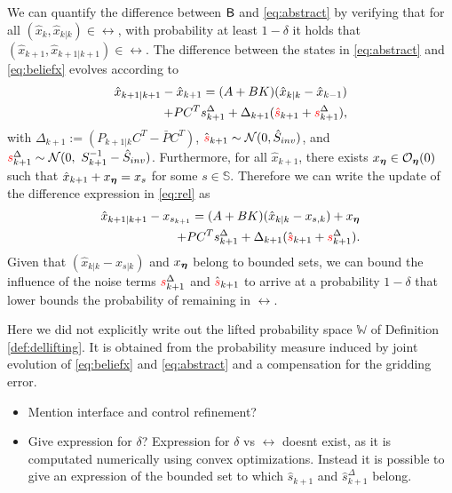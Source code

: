 \documentclass{ifacconf}
\newcommand{\red}[1]{{\color{red} #1}}
\begin{document}
We can quantify the difference between $\mathsf{B}$ and \eqref{eq:abstract} by verifying that for all  $(\hat x_k,\hat x_{k|k})\in \rel$, with probability at least $1-\delta$ it holds that $(\hat x_{k+1},\hat x_{k+1|k+1})\in \rel$. The difference between the states in \eqref{eq:abstract} and \eqref{eq:beliefx} evolves according to
\begin{equation}
\begin{aligned}
  \hat x_{k+1|k+1}-  \hat x_{k+1}=(A+BK)(\hat x_{k|k}-\hat x_{k-1}) \\
  +  \bar P   C^T s^\Delta_{k+1} +\Delta_{k+1}( \red{\hat{s}}_{k+1}+ \red{s}^\Delta_{k+1}),
\end{aligned}
\end{equation}
with $\Delta_{k+1}:=(P_{k+1|k}C^T-  \bar P C^T)$, $ \hat{\red{s}}_{k+1}\sim \CA N (0,\hat{S}_{inv})$, and $ \red{s}^\Delta_{k+1}\sim  \CA N (0,\  S_{k+1}^{-1}-\hat{S}_{inv})$.
Furthermore, for all $\hat x_{k+1}$, there exists $x_{\boldsymbol{\eta}} \in \mathcal{O}_{\boldsymbol{\eta}} (0)$ such that  $\hat x_{k+1}+x_{\boldsymbol{\eta}} = x_s$ for some $s \in \mathbb{S}$. Therefore we can write the update of the difference expression in \eqref{eq:rel} as
\begin{equation}
\begin{aligned}
 \hat x_{k+1|k+1} - x_{s_{k+1}}=(A+BK)(\hat x_{k|k}- x_{s,k})+x_\grid \\ + \bar P   C^T s^\Delta_{k+1} +\Delta_{k+1}( \hat{\red{s}}_{k+1}+ \red{s}^\Delta_{k+1}).
\end{aligned}
\end{equation}
Given that $(\hat x_{k|k}-\hat x_{s|k})$ and $x_{\boldsymbol{\eta}}$ belong to bounded sets, we can bound the influence of the noise terms $\red{s}^\Delta_{k+1}$ and $ \hat{\red{s}}_{k+1}$   to arrive at a probability $1-\delta$ that lower bounds the probability of remaining in $\rel$.
\begin{remark}
  Here we did not explicitly write out the lifted probability space $\mathbb{W}$ of Definition \ref{def:dellifting}. It is obtained from the probability measure induced by joint evolution of \eqref{eq:beliefx} and \eqref{eq:abstract} and a compensation for the gridding error.
\end{remark}

{\color{red}
\begin{itemize}
  \item Mention interface and control refinement?
  \item Give expression for $\delta$? \color{orange} Expression for $\delta$ vs $\rel$ doesnt exist, as it is computated numerically using convex optimizations.  Instead it is possible to give an expression  of the bounded set to which $\hat s_{k+1}$ and  $\hat s^{\Delta}_{k+1}$ belong. 
\end{itemize}
}
\end{document}
